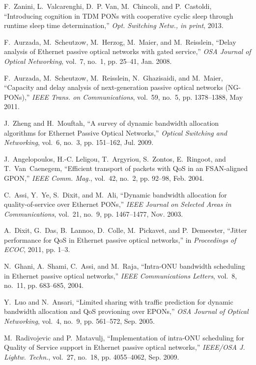 \documentclass[article]{IEEEtran}
\begin{document}
\begin{thebibliography}{100}
F.~Zanini, L.~Valcarenghi, D.~P. Van, M.~Chincoli, and P.~Castoldi,
  ``Introducing cognition in {TDM} {PONs} with cooperative cyclic sleep through
  runtime sleep time determination,'' \emph{Opt. Switching Netw., in print},
  2013.

F.~Aurzada, M.~Scheutzow, M.~Herzog, M.~Maier, and M.~Reisslein, ``Delay
  analysis of {Ethernet} passive optical networks with gated service,''
  \emph{OSA Journal of Optical Networking}, vol.~7, no.~1, pp. 25--41, Jan.
  2008.

F.~Aurzada, M.~Scheutzow, M.~Reisslein, N.~Ghazisaidi, and M.~Maier, ``Capacity
  and delay analysis of next-generation passive optical networks {(NG-PONs)},''
  \emph{IEEE Trans. on Communications}, vol.~59, no.~5, pp. 1378--1388, May
  2011.

J.~Zheng and H.~Mouftah, ``A survey of dynamic bandwidth allocation algorithms
  for {Ethernet Passive Optical Networks},'' \emph{Optical Switching and
  Networking}, vol.~6, no.~3, pp. 151--162, Jul. 2009.

J.~Angelopoulos, H.-C. Leligou, T.~Argyriou, S.~Zontos, E.~Ringoot, and
  T.~{Van~Caenegem}, ``Efficient transport of packets with {QoS} in an
  {FSAN}-aligned {GPON},'' \emph{IEEE Comm. Mag.}, vol.~42, no.~2, pp. 92--98,
  Feb. 2004.

C.~Assi, Y.~Ye, S.~Dixit, and M.~Ali, ``Dynamic bandwidth allocation for
  quality-of-service over {Ethernet PONs},'' \emph{IEEE Journal on Selected
  Areas in Communications}, vol.~21, no.~9, pp. 1467--1477, Nov. 2003.

A.~Dixit, G.~Das, B.~Lannoo, D.~Colle, M.~Pickavet, and P.~Demeester, ``Jitter
  performance for {QoS} in {Ethernet} passive optical networks,'' in
  \emph{Proceedings of ECOC}, 2011, pp. 1--3.

N.~Ghani, A.~Shami, C.~Assi, and M.~Raja, ``Intra-{ONU} bandwidth scheduling in
  {Ethernet} passive optical networks,'' \emph{IEEE Communications Letters},
  vol.~8, no.~11, pp. 683--685, 2004.

Y.~Luo and N.~Ansari, ``Limited sharing with traffic prediction for dynamic
  bandwidth allocation and {QoS} provioning over {EPONs},'' \emph{OSA Journal
  of Optical Networking}, vol.~4, no.~9, pp. 561--572, Sep. 2005.

M.~Radivojevic and P.~Matavulj, ``Implementation of intra-{ONU} scheduling for
  {Quality of Service} support in {Ethernet} passive optical networks,''
  \emph{IEEE/OSA J. Lightw. Techn.}, vol.~27, no.~18, pp. 4055--4062, Sep.
  2009.


\end{thebibliography}
\end{document}
